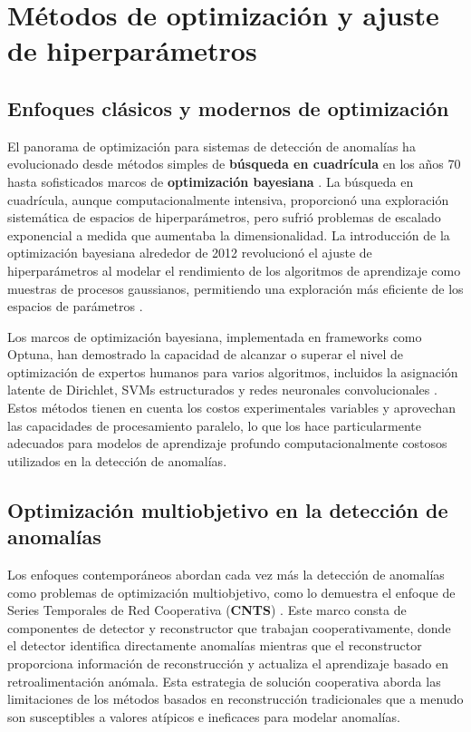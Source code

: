 \section{Métodos de optimización y ajuste de hiperparámetros}
\subsection{Enfoques clásicos y modernos de optimización}

El panorama de optimización para sistemas de detección de anomalías ha evolucionado desde métodos simples de \textbf{búsqueda en cuadrícula} en los años 70 \cite{holland_adaptation_1992} hasta sofisticados marcos de \textbf{optimización bayesiana} \cite{snoek_practical_2012}. La búsqueda en cuadrícula, aunque computacionalmente intensiva, proporcionó una exploración sistemática de espacios de hiperparámetros, pero sufrió problemas de escalado exponencial a medida que aumentaba la dimensionalidad. La introducción de la optimización bayesiana alrededor de 2012 revolucionó el ajuste de hiperparámetros al modelar el rendimiento de los algoritmos de aprendizaje como muestras de procesos gaussianos, permitiendo una exploración más eficiente de los espacios de parámetros \cite{snoek_practical_2012}.

Los marcos de optimización bayesiana, implementada en frameworks como Optuna, han demostrado la capacidad de alcanzar o superar el nivel de optimización de expertos humanos para varios algoritmos, incluidos la asignación latente de Dirichlet, SVMs estructurados y redes neuronales convolucionales \cite{akiba_optuna_2019}. Estos métodos tienen en cuenta los costos experimentales variables y aprovechan las capacidades de procesamiento paralelo, lo que los hace particularmente adecuados para modelos de aprendizaje profundo computacionalmente costosos utilizados en la detección de anomalías.



\subsection{Optimización multiobjetivo en la detección de anomalías}

Los enfoques contemporáneos abordan cada vez más la detección de anomalías como problemas de optimización multiobjetivo, como lo demuestra el enfoque de Series Temporales de Red Cooperativa (\textbf{CNTS}) \cite{yang_cnts_2023}. Este marco consta de componentes de detector y reconstructor que trabajan cooperativamente, donde el detector identifica directamente anomalías mientras que el reconstructor proporciona información de reconstrucción y actualiza el aprendizaje basado en retroalimentación anómala. Esta estrategia de solución cooperativa aborda las limitaciones de los métodos basados en reconstrucción tradicionales que a menudo son susceptibles a valores atípicos e ineficaces para modelar anomalías.